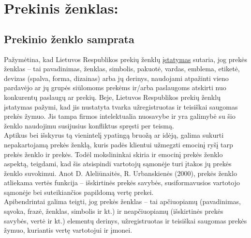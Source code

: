 \documentclass[12pt,titlepage]{article}
\begin{document}
\section{Prekinis ženklas:}
\subsection{Prekinio ženklo samprata}
\justify
\hspace{\parindent} 
Pažymėtina, kad Lietuvos Respublikos prekių ženklų \href{https://e-seimas.lrs.lt/portal/legalAct/lt/TAD/TAIS.111762?jfwid=tu0odnqqe}{įstatymas} sutaria, jog prekės ženklas – tai pavadinimas, ženklas, simbolis, pakuotė, vardas, emblema, etiketė, devizas (spalva, forma, dizainas) arba jų derinys, naudojami atpažinti vieno pardavėjo ar jų grupės siūlomoms prekėms ir/arba paslaugoms atskirti nuo konkurentų paslaugų ar prekių. Beje, Lietuvos Respublikos prekių ženklų įstatymas pažymi, kad jis nustatyta tvarka užregistruotas ir teisiškai saugomas prekės žymuo.\parencite{vanagiene2008prekes}  Jis tampa firmos intelektualia nuosavybe ir yra galimybė su šio ženklo naudojimu susijusius konfliktus spręsti per teismą.\\

Aptikus bei išskyrus tą vienintelį ypatingą bruožą ar idėją, galima sukurti nepakartojamą prekės ženklą, kuris padės klientui užmegzti emocinį ryšį tarp prekės ženklo ir prekės. Todėl mokslininkai skiria ir emocinį prekės ženklo aspektą, teigdami, kad šis atsispindi vartotojų sąmonėje turi įtakos jų prekės ženklo suvokimui. Anot D. Aleliūnaitės, R. Urbanskienės (2000), prekės ženklo atliekama vertės funkcija – išskirtinės prekės savybės, susiformavusios vartotojo sąmonėje bei suteikiančios papildomą vertę prekei.\\

Apibendrintai galima teigti, jog prekės ženklas – tai apčiuopiamų (pavadinimas, sąvoka, frazė, ženklas, simbolis ir kt.) ir neapčiuopiamų (išskirtinės prekės savybės, vertė ir kt.) elementų derinys, užregistruotas ir teisiškai saugomas prekės žymuo, kuriantis vertę vartotojui ir įmonei. 

\justify
\end{document}
